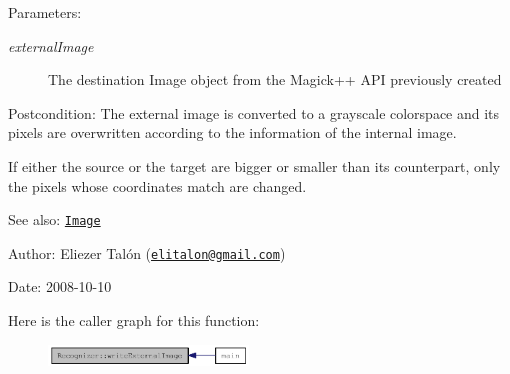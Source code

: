 \begin{Desc}
\item[Parameters:]
\begin{description}
\item[{\em externalImage}]The destination Image object from the Magick++ API previously created\end{description}
\end{Desc}
\begin{Desc}
\item[Postcondition:]The external image is converted to a grayscale colorspace and its pixels are overwritten according to the information of the internal image. 

If either the source or the target are bigger or smaller than its counterpart, only the pixels whose coordinates match are changed.\end{Desc}
\begin{Desc}
\item[See also:]\href{http://www.imagemagick.org/Magick++/Image.html}{\tt Image}\end{Desc}
\begin{Desc}
\item[Author:]Eliezer Talón (\href{mailto:elitalon@gmail.com}{\tt elitalon@gmail.com}) \end{Desc}
\begin{Desc}
\item[Date:]2008-10-10 \end{Desc}


Here is the caller graph for this function:\nopagebreak
\begin{figure}[H]
\begin{center}
\leavevmode
\includegraphics[width=151pt]{class_recognizer_559f62a3e3e2d0b799bab38e975b4b67_icgraph}
\end{center}
\end{figure}
